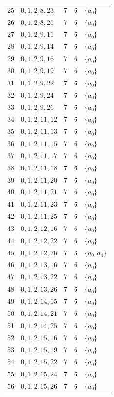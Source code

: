 \begin{longtable}{@{}r l c c l@{}}
25 & $0,1,2,8,23$ & 7 & 6 & $\{a_{0}\}$\\
26 & $0,1,2,8,25$ & 7 & 6 & $\{a_{0}\}$\\
27 & $0,1,2,9,11$ & 7 & 6 & $\{a_{0}\}$\\
28 & $0,1,2,9,14$ & 7 & 6 & $\{a_{0}\}$\\
29 & $0,1,2,9,16$ & 7 & 6 & $\{a_{0}\}$\\
30 & $0,1,2,9,19$ & 7 & 6 & $\{a_{0}\}$\\
31 & $0,1,2,9,22$ & 7 & 6 & $\{a_{0}\}$\\
32 & $0,1,2,9,24$ & 7 & 6 & $\{a_{0}\}$\\
33 & $0,1,2,9,26$ & 7 & 6 & $\{a_{0}\}$\\
34 & $0,1,2,11,12$ & 7 & 6 & $\{a_{0}\}$\\
35 & $0,1,2,11,13$ & 7 & 6 & $\{a_{0}\}$\\
36 & $0,1,2,11,15$ & 7 & 6 & $\{a_{0}\}$\\
37 & $0,1,2,11,17$ & 7 & 6 & $\{a_{0}\}$\\
38 & $0,1,2,11,18$ & 7 & 6 & $\{a_{0}\}$\\
39 & $0,1,2,11,20$ & 7 & 6 & $\{a_{0}\}$\\
40 & $0,1,2,11,21$ & 7 & 6 & $\{a_{0}\}$\\
41 & $0,1,2,11,23$ & 7 & 6 & $\{a_{0}\}$\\
42 & $0,1,2,11,25$ & 7 & 6 & $\{a_{0}\}$\\
43 & $0,1,2,12,16$ & 7 & 6 & $\{a_{0}\}$\\
44 & $0,1,2,12,22$ & 7 & 6 & $\{a_{0}\}$\\
45 & $0,1,2,12,26$ & 7 & 3 & $\{a_{0},a_{4}\}$\\
46 & $0,1,2,13,16$ & 7 & 6 & $\{a_{0}\}$\\
47 & $0,1,2,13,22$ & 7 & 6 & $\{a_{0}\}$\\
48 & $0,1,2,13,26$ & 7 & 6 & $\{a_{0}\}$\\
49 & $0,1,2,14,15$ & 7 & 6 & $\{a_{0}\}$\\
50 & $0,1,2,14,21$ & 7 & 6 & $\{a_{0}\}$\\
51 & $0,1,2,14,25$ & 7 & 6 & $\{a_{0}\}$\\
52 & $0,1,2,15,16$ & 7 & 6 & $\{a_{0}\}$\\
53 & $0,1,2,15,19$ & 7 & 6 & $\{a_{0}\}$\\
54 & $0,1,2,15,22$ & 7 & 6 & $\{a_{0}\}$\\
55 & $0,1,2,15,24$ & 7 & 6 & $\{a_{0}\}$\\
56 & $0,1,2,15,26$ & 7 & 6 & $\{a_{0}\}$\\

\end{longtable}
